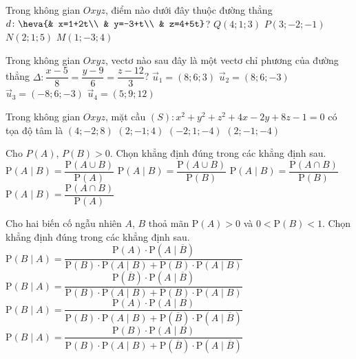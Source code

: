 \begin{ex}%
Trong không gian $Oxyz$, điểm nào dưới đây thuộc đường thẳng $d\colon\heva{& x=1+2t\\ & y=-3+t\\ & z=4+5t}$?
\choice
{$Q(4;1;3)$}
{$P(3;-2;-1)$}
{$N(2;1;5)$}
{\True $M(1;-3;4)$}
\end{ex}

\begin{ex}%
Trong không gian $O x y z$, vectơ nào sau đây là một vectơ chỉ phương của đường thẳng $\Delta\colon \dfrac{x-5}{8}=\dfrac{y-9}{6}=\dfrac{z-12}{3}$?
\choice
{\True $\overrightarrow{u}_1=(8 ; 6 ; 3)$}
{$\overrightarrow{u}_2=(8 ; 6 ;-3)$}
{$\overrightarrow{u}_3=(-8 ; 6 ;-3)$}
{$\overrightarrow{u}_4=(5 ; 9 ; 12)$}
\end{ex}

\begin{ex}%
Trong không gian $Oxyz$, mặt cầu $(S) \colon x^2+y^2+z^2+4x-2y+8z-1=0$ có tọa độ tâm là
\choice
{$(4;-2;8)$}
{ $(2;-1;4)$}
{\True $(-2;1;-4)$}
{$(2;-1;-4)$}
\loigiai{

}
\end{ex}

\begin{ex}%
Cho $P(A)$, $P(B)>0$. Chọn khẳng định đúng trong các khẳng định sau.
\choice
{$\mathrm{P}(A\mid B)=\dfrac{\mathrm{P}(A\cup B)}{\mathrm{P}(A)}$}
{$\mathrm{P}(A\mid B)=\dfrac{\mathrm{P}(A\cup B)}{\mathrm{P}(B)}$}
{\True $\mathrm{P}(A\mid B)=\dfrac{\mathrm{P}(A\cap B)}{\mathrm{P}(B)}$}
{$\mathrm{P}(A\mid B)=\dfrac{\mathrm{P}(A\cap B)}{\mathrm{P}(A)}$}
\end{ex}

\begin{ex}%
Cho hai biến cố ngẫu nhiên $A$, $B$ thoả mãn $\mathrm{P}(A)>0$ và $0<\mathrm{P}(B)<1$. Chọn khẳng định đúng trong các khẳng định sau.
\choice
{$\mathrm{P}(B\mid A)=\dfrac{\mathrm{P}(A)\cdot \mathrm{P}(A\mid \overline{B})}{\mathrm{P}(B)\cdot \mathrm{P}(A\mid B)+\mathrm{P}(B)\cdot \mathrm{P}(A\mid B)}$}
{$\mathrm{P}(B\mid A)=\dfrac{\mathrm{P}(\overline{B})\cdot \mathrm{P}(A\mid \overline{B})}{\mathrm{P}(B)\cdot \mathrm{P}(A\mid B)+\mathrm{P}(B)\cdot \mathrm{P}(A\mid B)}$}
{$\mathrm{P}(B\mid A)=\dfrac{\mathrm{P}(A)\cdot \mathrm{P}(A\mid B)}{\mathrm{P}(B)\cdot \mathrm{P}(A\mid B)+\mathrm{P}(\overline{B})\cdot \mathrm{P}(A\mid \overline{B})}$}
{\True $\mathrm{P}(B\mid A)=\dfrac{\mathrm{P}(B)\cdot \mathrm{P}(A\mid B)}{\mathrm{P}(B)\cdot \mathrm{P}(A\mid B)+\mathrm{P}(\overline{B})\cdot \mathrm{P}(A\mid \overline{B})}$}
\end{ex}

